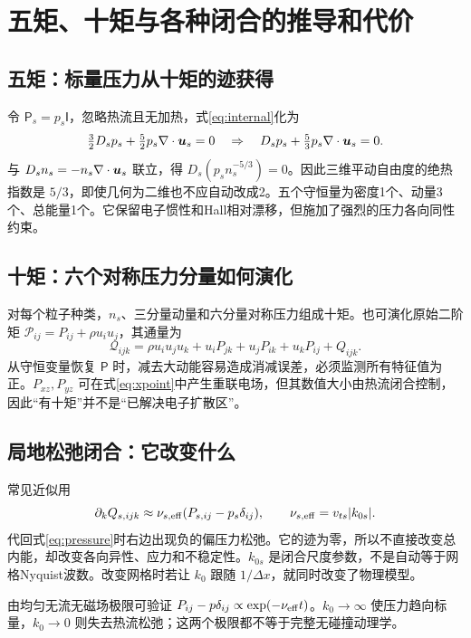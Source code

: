 

\section{五矩、十矩与各种闭合的推导和代价}
\subsection{五矩：标量压力从十矩的迹获得}
令 $\mathsf P_s=p_s\mathsf I$，忽略热流且无加热，式\eqref{eq:internal}化为
\begin{equation}\tfrac32D_sp_s+\tfrac52p_s\nabla\cdot\bm{u}_s=0
\quad\Rightarrow\quad D_sp_s+\tfrac53p_s\nabla\cdot\bm{u}_s=0.
\end{equation}
与 $D_sn_s=-n_s\nabla\cdot\bm{u}_s$ 联立，得 $D_s(p_sn_s^{-5/3})=0$。因此三维平动自由度的绝热指数是 $5/3$，即使几何为二维也不应自动改成2。五个守恒量为密度1个、动量3个、总能量1个。它保留电子惯性和Hall相对漂移，但施加了强烈的压力各向同性约束。

\subsection{十矩：六个对称压力分量如何演化}
对每个粒子种类，$n_s$、三分量动量和六分量对称压力组成十矩。也可演化原始二阶矩 $\mathcal P_{ij}=P_{ij}+\rho u_iu_j$，其通量为
\begin{equation}\mathcal Q_{ijk}=\rho u_iu_ju_k+u_iP_{jk}+u_jP_{ik}+u_kP_{ij}+Q_{ijk}.
\end{equation}
从守恒变量恢复 $\mathsf P$ 时，减去大动能容易造成消减误差，必须监测所有特征值为正。$P_{xz},P_{yz}$ 可在式\eqref{eq:xpoint}中产生重联电场，但其数值大小由热流闭合控制，因此“有十矩”并不是“已解决电子扩散区”。\citep{Wang2015}

\subsection{局地松弛闭合：它改变什么}
常见近似用
\begin{equation}\partial_kQ_{s,ijk}\approx\nu_{s,\rm eff}(P_{s,ij}-p_s\delta_{ij}),\qquad
\nu_{s,\rm eff}=v_{ts}|k_{0s}|.\label{eq:localclosure}
\end{equation}
代回式\eqref{eq:pressure}时右边出现负的偏压力松弛。它的迹为零，所以不直接改变总内能，却改变各向异性、应力和不稳定性。$k_{0s}$ 是闭合尺度参数，不是自动等于网格Nyquist波数。改变网格时若让 $k_0$ 跟随 $1/\Delta x$，就同时改变了物理模型。

由均匀无流无磁场极限可验证 $P_{ij}-p\delta_{ij}\propto\exp(-\nu_{\rm eff}t)$。$k_0\to\infty$ 使压力趋向标量，$k_0\to0$ 则失去热流松弛；这两个极限都不等于完整无碰撞动理学。

